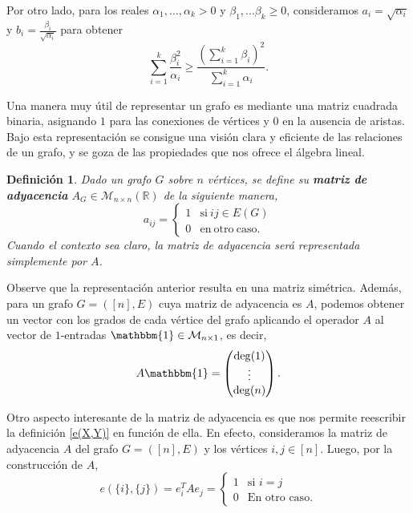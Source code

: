 \documentclass{article}[14pts]
\newtheorem{definicion}{Definición}
\begin{document}
Por otro lado, para los reales $\alpha_1,...,\alpha_k > 0$ y $\beta_1,...\beta_k \geq 0$, consideramos $a_i = \sqrt{\alpha_i}$ y $b_i = \frac{\beta_i}{\sqrt{\alpha_i}}$ para obtener
\begin{equation} \label{Desigualdad_from_CS}
    \sum_{i=1}^{k} \frac{\beta_{i}^{2}}{\alpha_i} \geq \frac{\left( \sum_{i = 1}^{k} \beta_i\right)^{2}}{\sum_{i=1}^{k}\alpha_i}.
\end{equation}\medskip 

Una manera muy útil de representar un grafo es mediante una matriz cuadrada binaria, asignando $1$ para las conexiones de vértices y $0$ en la ausencia de aristas. Bajo esta representación se consigue una visión clara y eficiente de las relaciones de un grafo, y se goza de las propiedades que nos ofrece el álgebra lineal.

\begin{definicion}
    Dado un grafo $G$ sobre $n$ vértices, se define su \textbf{matriz de adyacencia} $A_{G}\in \mathcal{M}_{n\times n}(\mathbb{R})$ de la siguiente manera,
    \begin{equation*}
        a_{ij} =
        \begin{cases}
            1 & \mathrm{si}\  ij\in E(G)\\
            0 & \mathrm{en\ otro\ caso.}
        \end{cases}
    \end{equation*}
    Cuando el contexto sea claro, la matriz de adyacencia será representada simplemente por $A$.
\end{definicion}

Observe que la representación anterior resulta en una matriz simétrica. Además, para un grafo $G = ([n], E)$ cuya matriz de adyacencia es $A$, podemos obtener un vector con los grados de cada vértice del grafo aplicando el operador $A$ al vector de $1$-entradas $\mathbbm{1}\in\mathcal{M}_{n\times 1}$, es decir,
\begin{equation} \label{A1=Mdeg}
    A\mathbbm{1} = 
    \begin{pmatrix}
        \deg(1) \\
        \vdots \\
        \deg(n)
    \end{pmatrix}.
\end{equation}

Otro aspecto interesante de la matriz de adyacencia es que nos permite reescribir la definición \ref{e(X,Y)} en función de ella. En efecto, consideramos la matriz de adyacencia $A$ del grafo $G = ([n], E)$ y los vértices $i,j\in [n]$. Luego, por la construcción de $A$,
\begin{equation*}
    e(\lbrace i\rbrace, \lbrace j\rbrace) = e_{i}^{T} A e_{j} = 
    \begin{cases}
        1 & \text{si } i=j \\
        0 & \text{En otro caso.}
    \end{cases}
\end{equation*}
\end{document}

